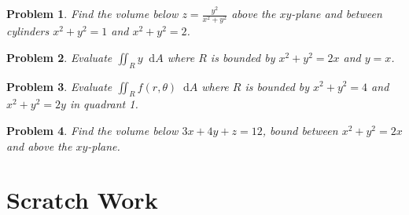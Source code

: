 \documentclass[11pt]{article}
\newtheorem{problem}{Problem}
\newcommand*\dif{\mathop{}\!\mathrm{d}}
\begin{document}
\begin{problem}
    Find the volume below $z = \frac{y^2}{x^2+y^2}$ above the $xy$-plane and between cylinders $x^2+y^2=1$ and $x^2+y^2=2$.
\end{problem}


\newpage

\begin{problem}
    Evaluate $\iint_R y \dif{A}$ where $R$ is bounded by $x^2+y^2 = 2x$ and $y=x$.
\end{problem}

\vspace{6cm}


\begin{problem}
    Evaluate $\iint_R f(r,\theta) \dif{A}$ where $R$ is bounded by $x^2+y^2 = 4$ and $x^2+y^2 = 2y$ in quadrant 1.
\end{problem}

\vspace{6cm}


\begin{problem}
    Find the volume below $3x+4y+z = 12$, bound between $x^2+y^2=2x$ and above the $xy$-plane.
\end{problem}



\newpage

\section{Scratch Work}
\end{document}

